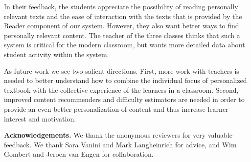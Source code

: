 In their feedback, the students appreciate the possibility of reading personally relevant texts and the ease of interaction with the texts that is provided by the Reader component of our system. However, they also want better ways to find personally relevant content. The teacher of the three classes thinks that such a system is critical for the modern classroom, but wants more detailed data about student activity within the system.

As future work we see two salient directions. First, more work with teachers is needed to better understand how to combine the individual focus of personalized textbook with the collective experience of the learners in a classroom.
Second, improved content recommenders and difficulty estimators are needed in order to provide an even better personalization of content and thus increase learner interest and motivation.



{\footnotesize
	{\bf Acknowledgements.} We thank the anonymous reviewers for very valuable feedback. We thank Sara Vanini and Mark Langheinrich for advice, and 
	 Wim Gombert and Jeroen van Engen for collaboration.
}